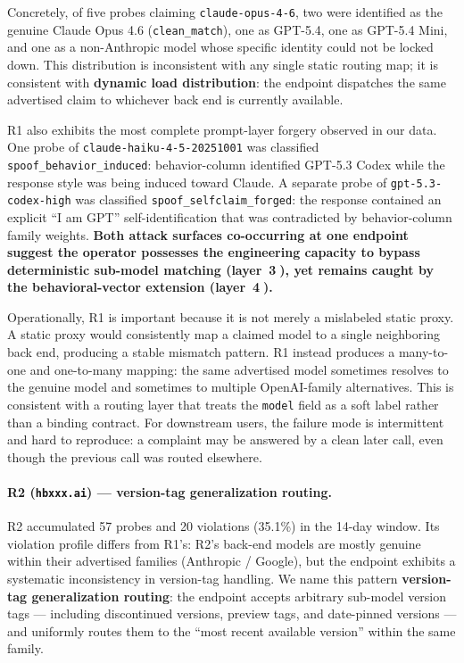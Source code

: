 \documentclass[10pt,a4paper,twocolumn]{article}
\begin{document}
Concretely, of five probes claiming \texttt{claude-opus-4-6}, two were
identified as the genuine Claude Opus 4.6 (\texttt{clean\_match}), one as
GPT-5.4, one as GPT-5.4 Mini, and one as a non-Anthropic model whose specific
identity could not be locked down. This distribution is inconsistent with any
single static routing map; it is consistent with \textbf{dynamic load
distribution}: the endpoint dispatches the same advertised claim to whichever
back end is currently available.

R1 also exhibits the most complete prompt-layer forgery observed in our data.
One probe of \texttt{claude-haiku-4-5-20251001} was classified
\texttt{spoof\_behavior\_induced}: behavior-column identified GPT-5.3 Codex
while the response style was being induced toward Claude. A separate probe of
\texttt{gpt-5.3-codex-high} was classified \texttt{spoof\_selfclaim\_forged}:
the response contained an explicit ``I am GPT'' self-identification that was
contradicted by behavior-column family weights. \textbf{Both attack surfaces
co-occurring at one endpoint suggest the operator possesses the engineering
capacity to bypass deterministic sub-model matching (layer~\textcircled{3}),
yet remains caught by the behavioral-vector extension (layer~\textcircled{4}).}

Operationally, R1 is important because it is not merely a mislabeled static
proxy. A static proxy would consistently map a claimed model to a single
neighboring back end, producing a stable mismatch pattern. R1 instead produces
a many-to-one and one-to-many mapping: the same advertised model sometimes
resolves to the genuine model and sometimes to multiple OpenAI-family
alternatives. This is consistent with a routing layer that treats the
\texttt{model} field as a soft label rather than a binding contract. For
downstream users, the failure mode is intermittent and hard to reproduce: a
complaint may be answered by a clean later call, even though the previous call
was routed elsewhere.

\paragraph{R2 (\texttt{hbxxx.ai}) --- version-tag generalization routing.}
R2 accumulated 57 probes and 20 violations (35.1\%) in the 14-day window. Its
violation profile differs from R1's: R2's back-end models are mostly genuine
within their advertised families (Anthropic / Google), but the endpoint
exhibits a systematic inconsistency in version-tag handling. We name this
pattern \textbf{version-tag generalization routing}: the endpoint accepts
arbitrary sub-model version tags --- including discontinued versions, preview
tags, and date-pinned versions --- and uniformly routes them to the ``most
recent available version'' within the same family.
\end{document}
